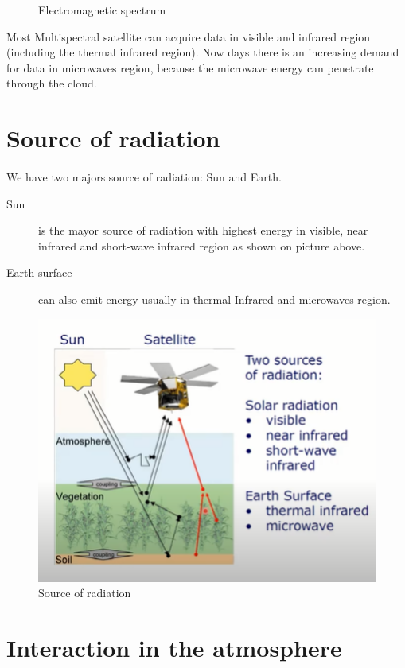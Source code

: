 \begin{description}
\begin{figure}[H]
\begin{center}
\end{center}
\caption{Electromagnetic spectrum}
\label{Electromagnetic spectrum}%
\end{figure}
Most Multispectral satellite can acquire data in visible and infrared region (including the thermal infrared region).  Now days there is an increasing demand for data in microwaves region, because the microwave energy can penetrate through the cloud.
\section{Source of radiation}
\paragraph{}
We have two majors source of radiation: Sun and Earth.
\begin{description}
\item[Sun] is the mayor source of radiation with highest energy in visible, near infrared and short-wave infrared region as shown on picture above.
\item[Earth surface] can also emit energy usually in thermal Infrared and microwaves region.
\end{description}
\begin{figure}[H]
\begin{center}
\includegraphics[scale=0.8]{images2.png} %
\end{center}
\caption{Source of radiation}
\label{Source of radiation}%
\end{figure}
\section{Interaction in the atmosphere}

\end{description}
